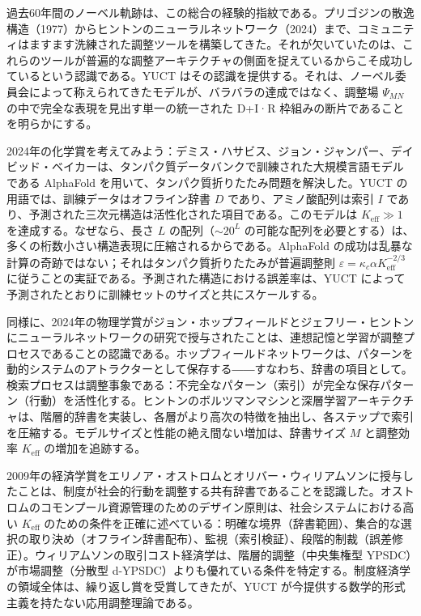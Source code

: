 \documentclass[12pt,a4paper]{article}
\begin{document}
	過去60年間のノーベル軌跡は、この総合の経験的指紋である。プリゴジンの散逸構造（1977）からヒントンのニューラルネットワーク（2024）まで、コミュニティはますます洗練された調整ツールを構築してきた。それが欠いていたのは、これらのツールが普遍的な調整アーキテクチャの側面を捉えているからこそ成功しているという認識である。YUCT はその認識を提供する。それは、ノーベル委員会によって称えられてきたモデルが、バラバラの達成ではなく、調整場 \(\Psi_{MN}\) の中で完全な表現を見出す単一の統一された D+I·R 枠組みの断片であることを明らかにする。
	
	2024年の化学賞を考えてみよう：デミス・ハサビス、ジョン・ジャンパー、デイビッド・ベイカーは、タンパク質データバンクで訓練された大規模言語モデルである AlphaFold を用いて、タンパク質折りたたみ問題を解決した。YUCT の用語では、訓練データはオフライン辞書 \(D\) であり、アミノ酸配列は索引 \(I\) であり、予測された三次元構造は活性化された項目である。このモデルは \(K_{\mathrm{eff}} \gg 1\) を達成する。なぜなら、長さ \(L\) の配列（\(\sim 20^L\) の可能な配列を必要とする）は、多くの桁数小さい構造表現に圧縮されるからである。AlphaFold の成功は乱暴な計算の奇跡ではない；それはタンパク質折りたたみが普遍調整則 \(\varepsilon = \kappa_c \alpha K_{\mathrm{eff}}^{-2/3}\) に従うことの実証である。予測された構造における誤差率は、YUCT によって予測されたとおりに訓練セットのサイズと共にスケールする。
	
	同様に、2024年の物理学賞がジョン・ホップフィールドとジェフリー・ヒントンにニューラルネットワークの研究で授与されたことは、連想記憶と学習が調整プロセスであることの認識である。ホップフィールドネットワークは、パターンを動的システムのアトラクターとして保存する――すなわち、辞書の項目として。検索プロセスは調整事象である：不完全なパターン（索引）が完全な保存パターン（行動）を活性化する。ヒントンのボルツマンマシンと深層学習アーキテクチャは、階層的辞書を実装し、各層がより高次の特徴を抽出し、各ステップで索引を圧縮する。モデルサイズと性能の絶え間ない増加は、辞書サイズ \(M\) と調整効率 \(K_{\mathrm{eff}}\) の増加を追跡する。
	
	2009年の経済学賞をエリノア・オストロムとオリバー・ウィリアムソンに授与したことは、制度が社会的行動を調整する共有辞書であることを認識した。オストロムのコモンプール資源管理のためのデザイン原則は、社会システムにおける高い \(K_{\mathrm{eff}}\) のための条件を正確に述べている：明確な境界（辞書範囲）、集合的な選択の取り決め（オフライン辞書配布）、監視（索引検証）、段階的制裁（誤差修正）。ウィリアムソンの取引コスト経済学は、階層的調整（中央集権型 YPSDC）が市場調整（分散型 d-YPSDC）よりも優れている条件を特定する。制度経済学の領域全体は、繰り返し賞を受賞してきたが、YUCT が今提供する数学的形式主義を持たない応用調整理論である。
	
\end{document}
